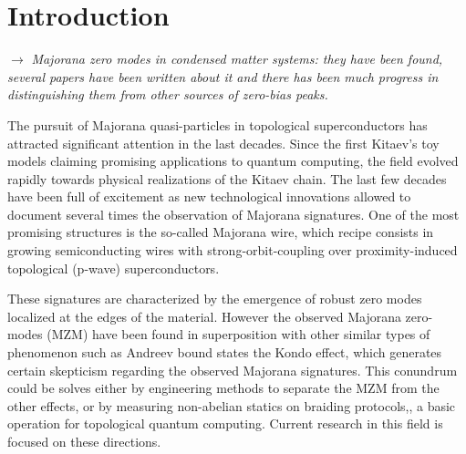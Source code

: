 \documentclass[showpacs,aps,prb,reprint,superscriptaddress]{revtex4-1}
\newcommand{\TS}[1]{{$\rightarrow$ {\sl#1}}}
\begin{document}

\maketitle


\section{Introduction}
\label{sec:Intro}

\TS{Majorana zero modes in condensed matter systems: they have been found, several papers have been written about it and there has been much progress in distinguishing them from other sources of zero-bias peaks.}

The pursuit of Majorana quasi-particles in topological superconductors has attracted significant attention in the last decades.\cite{alicea_new_2012,beenakker_search_2013}  Since the first Kitaev's toy models \cite{kitaev_unpaired_2001,kitaev_fault-tolerant_2003} claiming promising applications to quantum computing, the field evolved rapidly towards physical realizations of the Kitaev chain.  The last few decades have been full of excitement as new technological innovations  allowed to document several times the observation of Majorana signatures. \citep{mourik_signatures_2012,das_zero-bias_2012,deng_anomalous_2012,nadj-perge_observation_2014,deng_majorana_2016,zhang_quantized_2018}  One of the most promising structures is the so-called Majorana wire, which recipe consists in growing semiconducting wires with strong-orbit-coupling over proximity-induced topological (p-wave) superconductors.  

These signatures are characterized by the emergence of robust zero modes localized at the edges of the material. However the observed Majorana zero-modes (MZM) have been found in superposition with other similar types of phenomenon such as Andreev bound states \cite{sarma_majorana_2012} the Kondo effect, \cite{lee_zero-bias_2012} which generates certain skepticism regarding the observed Majorana signatures. This conundrum could be solves  either by engineering methods to separate the  MZM from the other effects\cite{ruiz-tijerina_interaction_2015,liu_andreev_2017}, or by measuring non-abelian statics on braiding protocols,\cite{aasen_milestones_2016,sarma_majorana_2015,heck_coulomb-assisted_2012},  a basic operation for topological quantum computing. Current research in this field is focused on these directions. 
\end{document}
